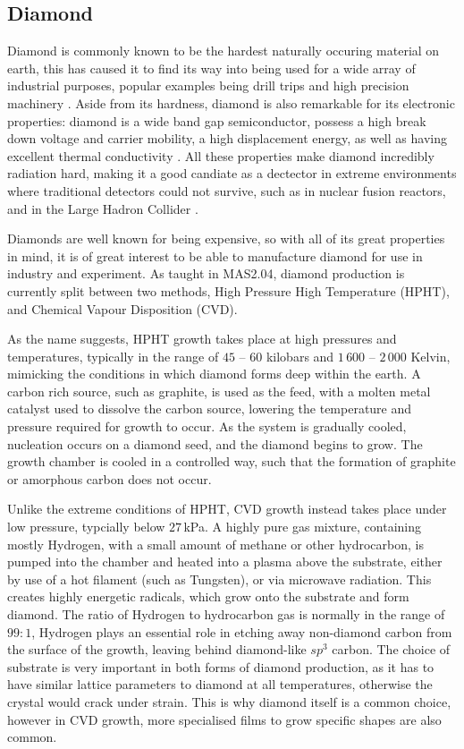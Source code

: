 \documentclass[10pt,a4paper,twocolumn,twoside]{extarticle}
\begin{document}
\subsection{Diamond}

Diamond is commonly known to be the hardest naturally occuring material on earth, this has caused it to find its way into being used for a wide array of industrial purposes, popular examples being drill trips and high precision machinery \cite{DiamondHardness}. Aside from its hardness, diamond is also remarkable for its electronic properties: diamond is a wide band gap semiconductor, possess a high break down voltage and carrier mobility, a high displacement energy, as well as having excellent thermal conductivity \cite{DiamondElectronic}. All these properties make diamond incredibly radiation hard, making it a good candiate as a dectector in extreme environments where traditional detectors could not survive, such as in nuclear fusion reactors, and in the Large Hadron Collider \cite{DiamondSensor}. 

Diamonds are well known for being expensive, so with all of its great properties in mind, it is of great interest to be able to manufacture diamond for use in industry and experiment. As taught in MAS2.04, diamond production is currently split between two methods, High Pressure High Temperature (HPHT), and Chemical Vapour Disposition (CVD).

As the name suggests, HPHT growth takes place at high pressures and temperatures, typically in the range of $45$ -- $60$ kilobars and $1\,600$ -- $2\,000$ Kelvin, mimicking the conditions in which diamond forms deep within the earth. A carbon rich source, such as graphite, is used as the feed, with a molten metal catalyst used to dissolve the carbon source, lowering the temperature and pressure required for growth to occur. As the system is gradually cooled, nucleation occurs on a diamond seed, and the diamond begins to grow. The growth chamber is cooled in a controlled way, such that the formation of graphite or amorphous carbon does not occur.

Unlike the extreme conditions of HPHT, CVD growth instead takes place under low pressure, typcially below $27$\,kPa. A highly pure gas mixture, containing mostly Hydrogen, with a small amount of methane or other hydrocarbon, is pumped into the chamber and heated into a plasma above the substrate, either by use of a hot filament (such as Tungsten), or via microwave radiation. This creates highly energetic radicals, which grow onto the substrate and form diamond. The ratio of Hydrogen to hydrocarbon gas is normally in the range of $99:1$, Hydrogen plays an essential role in etching away non-diamond carbon from the surface of the growth, leaving behind diamond-like $sp^3$ carbon. 
The choice of substrate is very important in both forms of diamond production, as it has to have similar lattice parameters to diamond at all temperatures, otherwise the crystal would crack under strain. This is why diamond itself is a common choice, however in CVD growth, more specialised films to grow specific shapes are also common. 
\end{document}
